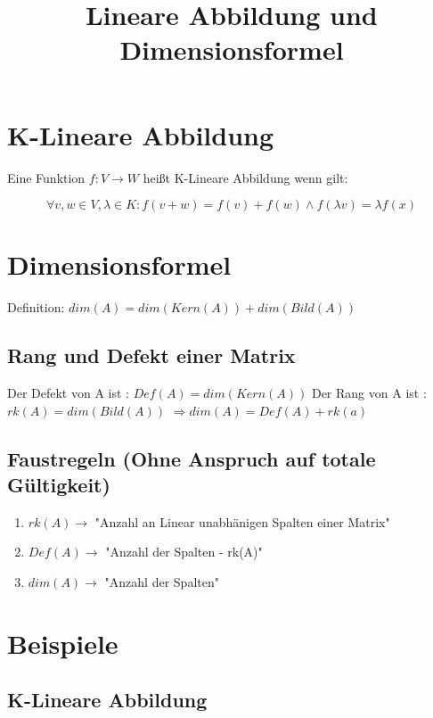 \documentclass[12pt]{article}
\begin{document}
    \title{Lineare Abbildung und Dimensionsformel}
    \maketitle
    \section{K-Lineare Abbildung}
    Eine Funktion  $f:V\rightarrow W$ \nolinebreak heißt K-Lineare Abbildung wenn gilt:

    \[\forall v,w\in V, \lambda \in K : f(v+w) = f(v) + f(w) \wedge f(\lambda v) = \lambda f(x)\]

    \section{Dimensionsformel}
    Definition: $dim(A)=dim(Kern(A))+dim(Bild(A))$

    \subsection{Rang und Defekt einer Matrix}

    Der Defekt von A ist : $Def(A) = dim(Kern(A))$ \newline
    \newline
    Der Rang von A ist : $rk(A)=dim(Bild(A))$ \newline
    \newline
    $\Rightarrow dim(A)=Def(A)+rk(a)$


    \subsection{Faustregeln (Ohne Anspruch auf totale Gültigkeit)}

    \begin{enumerate}
        \item $rk(A)\rightarrow$ "Anzahl an Linear unabhänigen Spalten einer Matrix"
        \item $Def(A) \rightarrow$ "Anzahl der Spalten - rk(A)"
        \item $dim(A) \rightarrow $ "Anzahl der Spalten"
    \end{enumerate}

    \newpage
    \section{Beispiele}

    \subsection{K-Lineare Abbildung}
\end{document}
